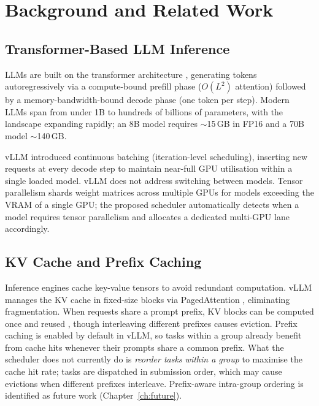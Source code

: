 \documentclass[logo,bsc,singlespacing,parskip,online]{infthesis}
\begin{document}

\chapter{Background and Related Work}


\section{Transformer-Based LLM Inference}

LLMs are built on the transformer architecture \citep{vaswani2017attention}, generating tokens autoregressively via a compute-bound prefill phase ($O(L^2)$ attention) followed by a memory-bandwidth-bound decode phase (one token per step). Modern LLMs span from under 1B to hundreds of billions of parameters, with the landscape expanding rapidly; an 8B model requires $\sim$15\,GB in FP16 and a 70B model $\sim$140\,GB.

vLLM \citep{kwon2023efficient} introduced continuous batching (iteration-level scheduling), inserting new requests at every decode step to maintain near-full GPU utilisation within a single loaded model. vLLM does not address switching between models. Tensor parallelism \citep{shoeybi2019megatron} shards weight matrices across multiple GPUs for models exceeding the VRAM of a single GPU; the proposed scheduler automatically detects when a model requires tensor parallelism and allocates a dedicated multi-GPU lane accordingly.

\section{KV Cache and Prefix Caching}
\label{sec:bg_kv_cache}

Inference engines cache key-value tensors to avoid redundant computation. vLLM manages the KV cache in fixed-size blocks via PagedAttention \citep{kwon2023efficient}, eliminating fragmentation. When requests share a prompt prefix, KV blocks can be computed once and reused \citep{zheng2024sglang}, though interleaving different prefixes causes eviction. Prefix caching is enabled by default in vLLM, so tasks within a group already benefit from cache hits whenever their prompts share a common prefix. What the scheduler does not currently do is \emph{reorder tasks within a group} to maximise the cache hit rate; tasks are dispatched in submission order, which may cause evictions when different prefixes interleave. Prefix-aware intra-group ordering is identified as future work (Chapter~\ref{ch:future}).
\end{document}
